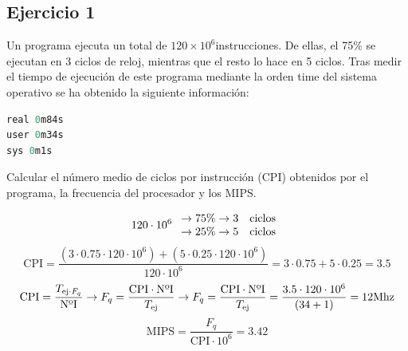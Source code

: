 \subsection{Ejercicio 1}
\noindent
Un programa ejecuta un total de $120\times 10^6$instrucciones. De ellas, el 75\% se ejecutan en 3 ciclos de reloj, mientras que el resto lo hace en 5 ciclos. Tras medir el tiempo de ejecución de este programa mediante la orden time del sistema operativo se ha obtenido la siguiente información:
\begin{lstlisting}[language=C]
real 0m84s
user 0m34s
sys 0m1s
\end{lstlisting} 
Calcular el número medio de ciclos por instrucción (CPI) obtenidos por el programa, la frecuencia del procesador y los MIPS.
\begin{tcolorbox}[colback=white,colframe=cyan!50!black,fonttitle=\bfseries]
\[120\cdot 10^6\left.\begin{array}{ll}
\rightarrow 75\%\rightarrow 3\quad\text{ciclos}\\
\rightarrow 25\%\rightarrow 5\quad\text{ciclos}
\end{array}\right.
\]
\[
\text{CPI}=\dfrac{(3\cdot0.75\cdot 120\cdot 10^6)+(5\cdot 0.25\cdot 120\cdot 10^6)}{120\cdot 10^6}=3\cdot 0.75+5\cdot 0.25=3.5
\]
\[
\text{CPI}=\dfrac{T_{\text{ej}\cdot F_q}}{\text{NºI}}\rightarrow F_q=\dfrac{\text{CPI}\cdot\text{NºI}}{T_{\text{ej}}}\rightarrow F_q=\dfrac{\text{CPI}\cdot\text{NºI}}{T_{\text{ej}}}=\dfrac{3.5\cdot 120\cdot 10^6}{(34+1)}=12\text{Mhz}
\]
\[
\text{MIPS}=\dfrac{F_q}{\text{CPI}\cdot 10^6}=3.42
\]
\end{tcolorbox}
